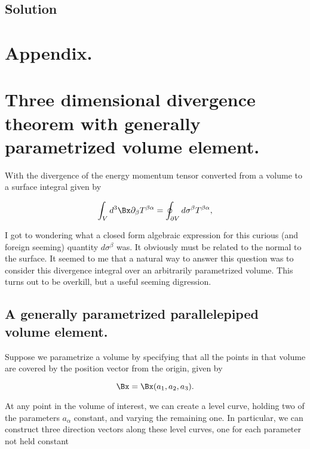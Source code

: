 \subsection{Solution}

\section{Appendix.}

\section{Three dimensional divergence theorem with generally parametrized volume element.}

With the divergence of the energy momentum tensor converted from a volume to a surface integral given by

\begin{equation}\label{eqn:relativisticElectrodynamicsPS6:340}
\int_V d^3 \Bx \partial_\beta T^{\beta \alpha} = \oint_{\partial V} d \sigma^\beta T^{\beta \alpha},
\end{equation}

I got to wondering what a closed form algebraic expression for this curious (and foreign seeming) quantity $d \sigma^\beta$ was.  It obviously must be related to the normal to the surface.  It seemed to me that a natural way to answer this question was to consider this divergence integral over an arbitrarily parametrized volume.  This turns out to be overkill, but a useful seeming digression.

\subsection{A generally parametrized parallelepiped volume element.}

Suppose we parametrize a volume by specifying that all the points in that volume are covered by the position vector from the origin, given by

\begin{equation}\label{eqn:relativisticElectrodynamicsPS6:360}
\Bx = \Bx(a_1, a_2, a_3).
\end{equation}

At any point in the volume of interest, we can create a level curve, holding two of the parameters $a_\alpha$ constant, and varying the remaining one.  In particular, we can construct three direction vectors along these level curves, one for each parameter not held constant

